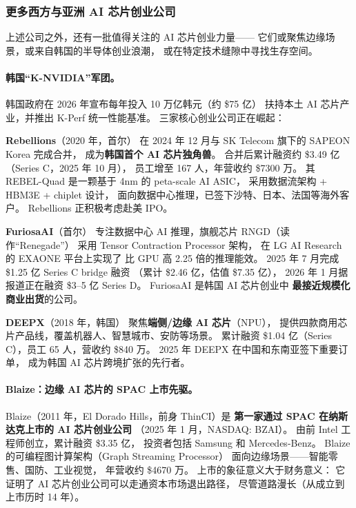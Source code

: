 \subsubsection{更多西方与亚洲 AI 芯片创业公司}

上述公司之外，还有一批值得关注的 AI 芯片创业力量——
它们或聚焦边缘场景，或来自韩国的半导体创业浪潮，
或在特定技术缝隙中寻找生存空间。

\paragraph{韩国``K-NVIDIA''军团。}
韩国政府在 2026 年宣布每年投入 10 万亿韩元（约 \$75 亿）
扶持本土 AI 芯片产业，并推出 K-Perf 统一性能基准。
三家核心创业公司正在崛起：

\textbf{Rebellions}（2020 年，首尔）
在 2024 年 12 月与 SK Telecom 旗下的 SAPEON Korea 完成合并，
成为\textbf{韩国首个 AI 芯片独角兽}。
合并后累计融资约 \$3.49 亿（Series C，2025 年 10 月），
员工增至 167 人，年营收约 \$7300 万。
其 REBEL-Quad 是一颗基于 4nm 的 peta-scale AI ASIC，
采用数据流架构 + HBM3E + chiplet 设计，
面向数据中心推理，已签下沙特、日本、法国等海外客户。
Rebellions 正积极考虑赴美 IPO。

\textbf{FuriosaAI}（首尔）
专注数据中心 AI 推理，旗舰芯片 RNGD（读作``Renegade''）
采用 Tensor Contraction Processor 架构，
在 LG AI Research 的 EXAONE 平台上实现了
比 GPU 高 2.25 倍的推理能效。
2025 年 7 月完成 \$1.25 亿 Series C bridge 融资
（累计 \$2.46 亿，估值 \$7.35 亿），
2026 年 1 月据报道正在融资 \$3--5 亿 Series D。
FuriosaAI 是韩国 AI 芯片创业中
\textbf{最接近规模化商业出货}的公司。

\textbf{DEEPX}（2018 年，韩国）
聚焦\textbf{端侧/边缘 AI 芯片}（NPU），
提供四款商用芯片产品线，覆盖机器人、智慧城市、安防等场景。
累计融资 \$1.04 亿（Series C），员工 65 人，营收约 \$840 万。
2025 年 DEEPX 在中国和东南亚签下重要订单，
成为韩国 AI 芯片跨境扩张的先行者。

\paragraph{Blaize：边缘 AI 芯片的 SPAC 上市先驱。}
Blaize（2011 年，El Dorado Hills，前身 ThinCI）是
\textbf{第一家通过 SPAC 在纳斯达克上市的 AI 芯片创业公司}
（2025 年 1 月，NASDAQ: BZAI）。
由前 Intel 工程师创立，累计融资 \$3.35 亿，
投资者包括 Samsung 和 Mercedes-Benz。
Blaize 的可编程图计算架构（Graph Streaming Processor）
面向边缘场景——智能零售、国防、工业视觉，
年营收约 \$4670 万。
上市的象征意义大于财务意义：
它证明了 AI 芯片创业公司可以走通资本市场退出路径，
尽管道路漫长（从成立到上市历时 14 年）。

